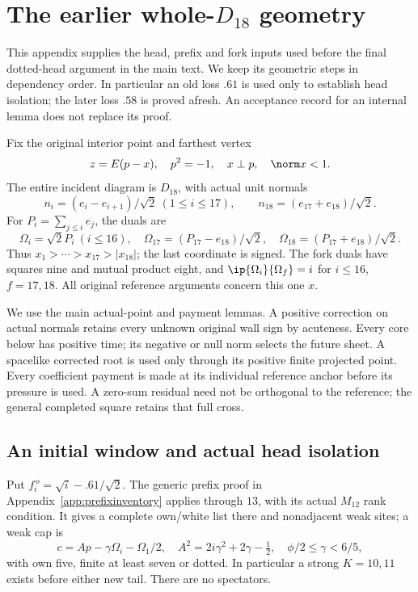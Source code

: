 \section{The earlier whole-\(D_{18}\) geometry}
\label{app:D18foundation}
This appendix supplies the head, prefix and fork inputs used before
the final dotted-head argument in the main text. We keep its geometric
steps in dependency order. In particular an old loss \(.61\) is used
only to establish head isolation; the later loss \(.58\) is proved
afresh. An acceptance record for an internal lemma does not replace
its proof.

Fix the original interior point and farthest vertex
\[
 z=E(p-x),\quad p^2=-1,\quad x\perp p,\quad \norm x<1.
\]
The entire incident diagram is \(D_{18}\), with actual unit normals
\[
 n_i=(e_i-e_{i+1})/\sqrt2\ (1\leq i\leq17),\qquad
 n_{18}=(e_{17}+e_{18})/\sqrt2 .
\]
For \(P_i=\sum_{j\leq i}e_j\), the duals are
\[
 \Omega_i=\sqrt2P_i\ (i\leq16),\quad
 \Omega_{17}=(P_{17}-e_{18})/\sqrt2,\quad
 \Omega_{18}=(P_{17}+e_{18})/\sqrt2.
\]
Thus \(x_1>\cdots>x_{17}>|x_{18}|\); the last coordinate is signed.
The fork duals have squares nine and mutual product eight, and
\(\ip{\Omega_i}{\Omega_f}=i\) for \(i\leq16\), \(f=17,18\).
All original reference arguments concern this one \(x\).

We use the main actual-point and payment lemmas.
A positive correction on actual normals retains every unknown original
wall sign by acuteness. Every core below has positive time; its negative
or null norm selects the future sheet. A spacelike corrected root is
used only through its positive finite projected point.
Every coefficient payment is made at its individual reference anchor
before its pressure is used. A zero-sum residual need not be orthogonal
to the reference; the general completed square retains that full cross.

\subsection{An initial window and actual head isolation}
\label{app:D18oldhead}
Put \(f_i^{\,o}=\sqrt i-.61/\sqrt2\).
The generic prefix proof in Appendix~\ref{app:prefixinventory}
applies through \(13\), with its actual \(M_{12}\) rank condition.
It gives a complete own/white list there and nonadjacent weak sites;
a weak cap is
\[
 c=Ap-\gamma\Omega_i-\Omega_1/2,\quad
 A^2=2i\gamma^2+2\gamma-\tfrac12,\quad
 \phi/2\leq\gamma<6/5,
\]
with own five, finite at least seven or dotted.
In particular a strong \(K=10,11\) exists before either new tail.
There are no spectators.

